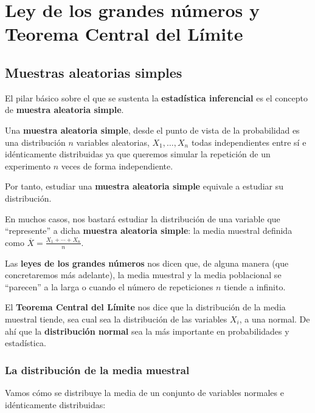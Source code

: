 \documentclass[]{book}
\begin{document}
\hypertarget{ley-de-los-grandes-nuxfameros-y-teorema-central-del-luxedmite}{%
\chapter{Ley de los grandes números y Teorema Central del Límite}\label{ley-de-los-grandes-nuxfameros-y-teorema-central-del-luxedmite}}

\hypertarget{muestras-aleatorias-simples}{%
\section{Muestras aleatorias simples}\label{muestras-aleatorias-simples}}

El pilar básico sobre el que se sustenta la \textbf{estadística inferencial} es el concepto de \textbf{muestra aleatoria simple}.

Una \textbf{muestra aleatoria simple}, desde el punto de vista de la probabilidad es una distribución \(n\) variables aleatorias, \(X_1,\ldots, X_n\) todas independientes entre sí e idénticamente distribuidas ya que queremos simular la repetición de un experimento \(n\) veces de forma independiente.

Por tanto, estudiar una \textbf{muestra aleatoria simple} equivale a estudiar su distribución.

En muchos casos, nos bastará estudiar la distribución de una variable que ``represente'' a dicha \textbf{muestra aleatoria simple}: la media muestral definida como \(\overline{X}=\frac{X_1+\cdots + X_n}{n}\).

Las \textbf{leyes de los grandes números} nos dicen que, de alguna manera (que concretaremos más adelante), la media muestral y la media poblacional se ``parecen'' a la larga o cuando el número de repeticiones \(n\) tiende a infinito.

El \textbf{Teorema Central del Límite} nos dice que la distribución de la media muestral tiende, sea cual sea la distribución de las variables \(X_i\), a una normal. De ahí que la \textbf{distribución normal} sea la más importante en probabilidades y estadística.

\hypertarget{la-distribuciuxf3n-de-la-media-muestral}{%
\subsection{La distribución de la media muestral}\label{la-distribuciuxf3n-de-la-media-muestral}}

Vamos cómo se distribuye la media de un conjunto de variables normales e idénticamente distribuidas:
\end{document}
